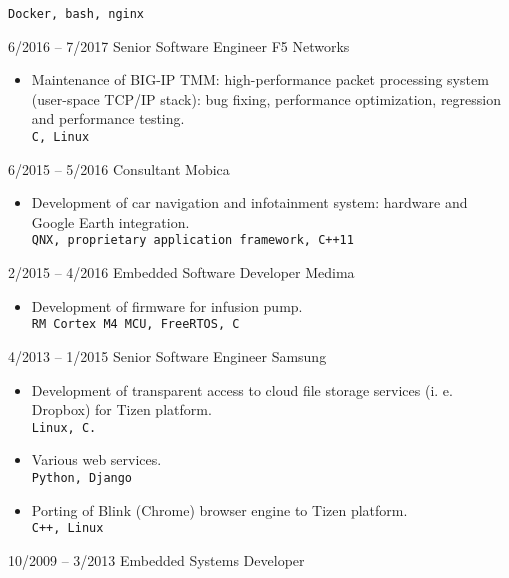 \documentclass[8pt]{developercv} %
\begin{document}
\begin{entrylist}
{\begin{itemize}
                    \texttt{Docker, bash, nginx}
                 \end{itemize}
                }
	\entry
		{6/2016 -- 7/2017}
		{Senior Software Engineer}
		{F5 Networks}
		{\begin{itemize}
                  \item Maintenance of BIG-IP TMM: high-performance packet
                    processing system (user-space TCP/IP stack): bug fixing,
                    performance optimization, regression and performance
                    testing.\\
                    \texttt{C, Linux}
                  \end{itemize}
                }
	\entry
		{6/2015 -- 5/2016}
		{Consultant}
		{Mobica}
		{\begin{itemize}
                  \item Development of car navigation and infotainment system:
                    hardware and Google Earth integration.\\
                    \texttt{QNX, proprietary application framework, C++11}
                  \end{itemize}
                }
	\entry
		{2/2015 -- 4/2016}
		{Embedded Software Developer}
		{Medima}
		{
                  \begin{itemize}
                  \item Development of firmware for infusion pump.\\
                    \texttt{RM Cortex M4 MCU, FreeRTOS, C}
                  \end{itemize}
                }
	\entry
		{4/2013 -- 1/2015}
		{Senior Software Engineer}
		{Samsung}
		{\begin{itemize}
                  \item Development of transparent access to cloud file storage
                    services (i. e. Dropbox) for Tizen platform.\\
                    \texttt{Linux, C.}
                  \item Various web services.\\
                    \texttt{Python, Django}
                  \item Porting of Blink (Chrome) browser engine
                    to Tizen platform.\\
                    \texttt{C++, Linux}
                  \end{itemize}
                }
	\entry
		{10/2009 -- 3/2013}
		{Embedded Systems Developer}

\end{entrylist}
\end{document}
